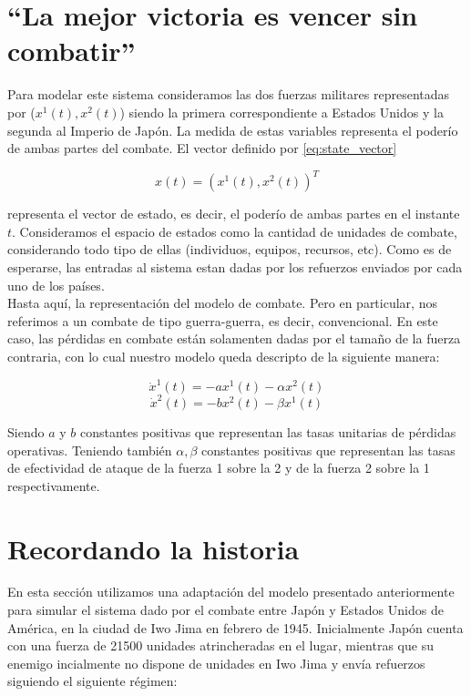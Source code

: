 \documentclass{sig-alternate}
\begin{document}
\section{``La mejor victoria es vencer sin combatir''}
\label{sec:allyourbasearebelongtous}
Para modelar este sistema consideramos las dos fuerzas militares representadas por ($x^1(t), x^2(t)$) siendo la primera correspondiente a Estados
Unidos y la segunda al Imperio de Japón. La medida de estas variables representa el poderío de ambas partes del combate. 
El vector definido por \eqref{eq:state_vector}

\begin{equation}
x(t) = ( x^1(t), x^2(t) )^T \label{eq:state_vector}
\end{equation}

representa el vector de estado, es decir, el poderío de ambas partes en el instante $t$. Consideramos el espacio de estados como la cantidad de 
unidades de combate, considerando todo tipo de ellas (individuos, equipos, recursos, etc). Como es de esperarse, las entradas al sistema estan 
dadas por los refuerzos enviados por cada uno de los países.\\
Hasta aquí, la representación del modelo de combate. Pero en particular, nos referimos a un combate de tipo guerra-guerra, es decir, convencional.
En este caso, las pérdidas en combate están solamenten dadas por el tamaño de la fuerza contraria, con lo cual nuestro modelo queda descripto de la
siguiente manera:

\begin{equation}
\dot{x}^1(t) = -ax^1(t) - \alpha x^2(t)\end{equation}
\begin{equation}
\dot{x}^2(t) = -bx^2(t) - \beta x^1(t)\end{equation}

Siendo $a$ y $b$ constantes positivas que representan las tasas unitarias de pérdidas operativas. Teniendo también $\alpha, \beta$ 
constantes positivas que representan las tasas de efectividad de ataque de la fuerza 1 sobre la 2 y de la fuerza 2 sobre la 1 respectivamente.

\section{Recordando la historia}
\label{sec:remember}
En esta sección utilizamos una adaptación del modelo presentado anteriormente para simular el sistema dado por el combate entre Japón y 
Estados Unidos de América, en la ciudad de Iwo Jima en febrero de 1945. Inicialmente Japón cuenta con una fuerza de 21500 unidades 
atrincheradas en el lugar, mientras que su enemigo incialmente no dispone de unidades en Iwo Jima y envía refuerzos siguiendo el siguiente 
régimen:
\end{document}
